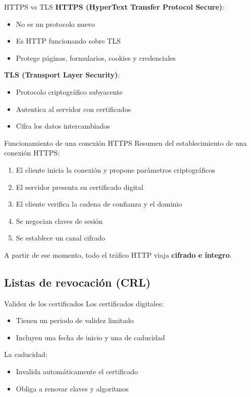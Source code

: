 \documentclass{beamer}
\begin{document}
\begin{frame}{HTTPS vs TLS}
\textbf{HTTPS (HyperText Transfer Protocol Secure)}:
\begin{itemize}
    \item No es un protocolo nuevo
    \item Es HTTP funcionando sobre TLS
    \item Protege páginas, formularios, cookies y credenciales
\end{itemize}

\vspace{0.3cm}
\textbf{TLS (Transport Layer Security)}:
\begin{itemize}
    \item Protocolo criptográfico subyacente
    \item Autentica al servidor con certificados
    \item Cifra los datos intercambiados
\end{itemize}
\end{frame}

\begin{frame}{Funcionamiento de una conexión HTTPS}
Resumen del establecimiento de una conexión HTTPS:
\begin{enumerate}
    \item El cliente inicia la conexión y propone parámetros criptográficos
    \item El servidor presenta su certificado digital
    \item El cliente verifica la cadena de confianza y el dominio
    \item Se negocian claves de sesión
    \item Se establece un canal cifrado
\end{enumerate}

\vspace{0.2cm}
A partir de ese momento, todo el tráfico HTTP viaja \textbf{cifrado e íntegro}.
\end{frame}

\subsection{Listas de revocación (CRL)}

\begin{frame}{Validez de los certificados}
Los certificados digitales:
\begin{itemize}
    \item Tienen un periodo de validez limitado
    \item Incluyen una fecha de inicio y una de caducidad
\end{itemize}

\vspace{0.3cm}
La caducidad:
\begin{itemize}
    \item Invalida automáticamente el certificado
    \item Obliga a renovar claves y algoritmos
\end{itemize}
\end{frame}
\end{document}
